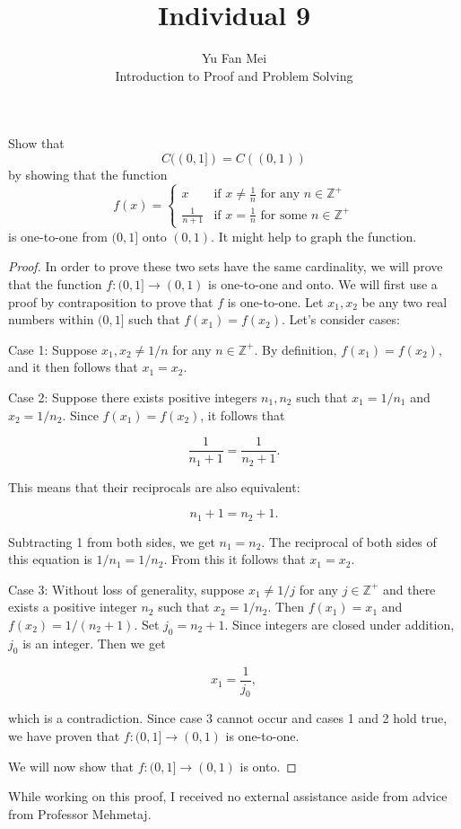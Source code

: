 \documentclass[12pt]{article}
\newenvironment{problem}[2][Problem]{\begin{trivlist}
\item[\hskip \labelsep {\bfseries #1}\hskip \labelsep {\bfseries #2.}]}{\end{trivlist}}
\begin{document}

\title{Individual 9}%
\author{Yu Fan Mei\\
	Introduction to Proof and Problem Solving} %

\maketitle

\begin{problem}{1}
    Show that  
\[
C((0, 1]) = C((0, 1))
\]  
by showing that the function  
\[
f(x) = 
\begin{cases} 
x & \text{if } x \neq \frac{1}{n} \text{ for any } n \in \mathbb{Z}^+ \\
\frac{1}{n+1} & \text{if } x = \frac{1}{n} \text{ for some } n \in \mathbb{Z}^+
\end{cases}
\]
is one-to-one from \((0, 1]\) onto \((0, 1)\). It might help to graph the function.
\end{problem}

\begin{proof} In order to prove these two sets have the same cardinality, we will prove that the function $f : (0, 1] \to (0, 1) $ is one-to-one and onto. We will first use a proof by contraposition to prove that $f$ is one-to-one. Let $x_1, x_2$ be any two real numbers within $(0, 1]$ such that $f(x_1) = f(x_2)$. Let's consider cases:
    
    Case 1: Suppose $x_1, x_2 \neq 1/n$ for any $n \in \mathbb{Z}^+$. By definition, $f(x_1) = f(x_2),$ and it then follows that $x_1 = x_2$. 
    
    Case 2: Suppose there exists positive integers $n_1, n_2$ such that $x_1 = 1/n_1$ and $x_2 = 1/n_2$. Since $f(x_1) = f(x_2)$, it follows that

    $$\frac{1}{n_1 + 1} = \frac{1}{n_2 + 1}.$$

    This means that their reciprocals are also equivalent:

    $$n_1 + 1 = n_2 + 1.$$

    Subtracting 1 from both sides, we get $n_1 = n_2$. The reciprocal of both sides of this equation is $1/n_1 = 1/n_2$. From this it follows that $x_1 = x_2$.

    Case 3: Without loss of generality, suppose $x_1 \neq 1/j$ for any $j \in \mathbb{Z}^+$ and there exists a positive integer $n_2$ such that $x_2 = 1/n_2$. Then $f(x_1) = x_1$ and $f(x_2) = 1/(n_2 + 1)$. Set $j_0 = n_2 + 1$. Since integers are closed under addition, $j_0$ is an integer. Then we get

    $$x_1 = \frac{1}{j_0},$$

    which is a contradiction. Since case 3 cannot occur and cases 1 and 2 hold true, we have proven that $f: (0, 1] \to (0, 1)$ is one-to-one.

    \noindent
    We will now show that $f: (0, 1] \to (0, 1) $ is onto. 

\end{proof}


\noindent While working on this proof, I received no external assistance aside from advice from Professor Mehmetaj.
\end{document}
